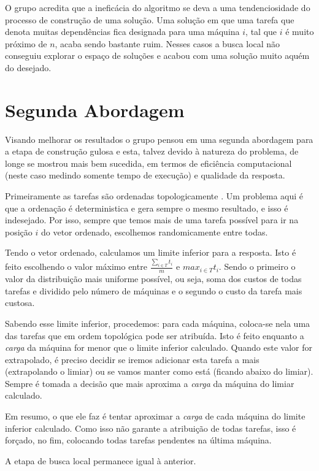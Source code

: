 \documentclass{report}
\begin{document}
O grupo acredita que a ineficácia do algoritmo se deva a uma tendenciosidade do
processo de construção de uma solução. Uma solução em que uma tarefa que denota
muitas dependências fica designada para uma máquina $i$, tal que $i$ é muito
próximo de $n$, acaba sendo bastante ruim. Nesses casos a busca local não
conseguiu explorar o espaço de soluções e acabou com uma solução muito aquém
do desejado.

\section{Segunda Abordagem}

Visando melhorar os resultados o grupo pensou em uma segunda abordagem para a
etapa de construção gulosa e esta, talvez devido à natureza do problema,
de longe se mostrou  mais bem sucedida, em termos de
eficiência computacional (neste caso medindo
somente tempo de execução) e qualidade da resposta.

Primeiramente as tarefas são ordenadas topologicamente \cite{top}.
Um problema aqui é que a ordenação é deterministica e gera
sempre o mesmo resultado, e isso é indesejado. Por isso, sempre que temos mais
de uma tarefa possível para ir na
posição $i$ do vetor ordenado, escolhemos randomicamente entre todas.

Tendo o vetor ordenado, calculamos um limite inferior para a
resposta. Isto é feito escolhendo o valor máximo entre $\frac{\sum_{i\in T}t_i}{m}$
 e $max_{i\in T}t_i$. Sendo o primeiro
o valor da distribuição mais uniforme possível, ou seja,
soma dos custos de todas tarefas e dividido pelo
número de máquinas e o segundo o custo da tarefa mais custosa.

Sabendo esse limite inferior, procedemos: para cada máquina, coloca-se
nela uma das tarefas que em ordem topológica pode ser atribuída.
Isto é feito enquanto a \emph{carga}
da máquina for menor que o limite inferior
calculado. Quando este valor for extrapolado, é preciso decidir se iremos
adicionar esta tarefa a mais
(extrapolando o limiar) ou se vamos manter como está (ficando abaixo do limiar).
Sempre é tomada a decisão que mais
aproxima a \emph{carga} da máquina do limiar calculado.

Em resumo, o que ele faz é tentar aproximar a \emph{carga} de
cada máquina do limite inferior calculado.
Como isso não garante a atribuição de todas tarefas, isso é forçado, no fim,
colocando todas tarefas pendentes na última máquina.

A etapa de busca local permanece igual à anterior.
\end{document}
